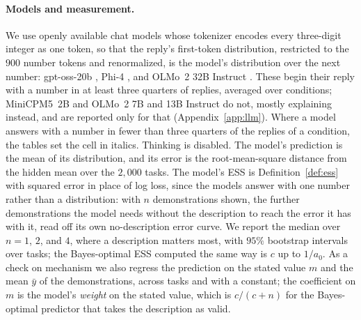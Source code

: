 \documentclass{article}
\begin{document}
\paragraph{Models and measurement.} We use openly available chat models whose tokenizer encodes every three-digit integer as one token, so that the reply's first-token distribution, restricted to the $900$ number tokens and renormalized, is the model's distribution over the next number: gpt-oss-20b \citep{openai2025}, Phi-4 \citep{abdin2024}, and OLMo~2 32B Instruct \citep{walsh2025}. These begin their reply with a number in at least three quarters of replies, averaged over conditions; MiniCPM5~2B \citep{minicpm5} and OLMo~2 7B and 13B Instruct do not, mostly explaining instead, and are reported only for that (Appendix~\ref{app:llm}). Where a model answers with a number in fewer than three quarters of the replies of a condition, the tables set the cell in italics. Thinking is disabled. The model's prediction is the mean of its distribution, and its error is the root-mean-square distance from the hidden mean over the $2{,}000$ tasks. The model's ESS is Definition~\ref{def:ess} with squared error in place of log loss, since the models answer with one number rather than a distribution: with $n$ demonstrations shown, the further demonstrations the model needs without the description to reach the error it has with it, read off its own no-description error curve. We report the median over $n = 1$, $2$, and $4$, where a description matters most, with $95\%$ bootstrap intervals over tasks; the Bayes-optimal ESS computed the same way is $c$ up to $1/a_0$. As a check on mechanism we also regress the prediction on the stated value $m$ and the mean $\bar y$ of the demonstrations, across tasks and with a constant; the coefficient on $m$ is the model's \emph{weight} on the stated value, which is $c/(c+n)$ for the Bayes-optimal predictor that takes the description as valid.

\begin{table}[t]
\centering\small
\setlength{\tabcolsep}{2.4pt}
\caption{\textbf{A loose description has its Bayes-optimal ESS; a specific one has a small fraction of it.} ESS of a description for each model against its Bayes-optimal ESS: the median over $n = 1$, $2$, and $4$ demonstrations shown ($\sigma = 60$, $2{,}000$ tasks; brackets, $95\%$ bootstrap intervals; negative: the description costs that many demonstrations). Columns: a valid description with Bayes-optimal ESS $1$, $4$, or $36$; an invalid one that would have ESS $36$; the description with ESS $36$ with a stated $10\%$ or $50\%$ chance of being wrong; an invalid one with a stated $50\%$ chance. The Bayes-optimal row takes a description as valid unless a reliability is stated, in which case it hedges with that $p$.}
\label{tab:llm}
\vspace{3pt}

\end{table}
\end{document}
